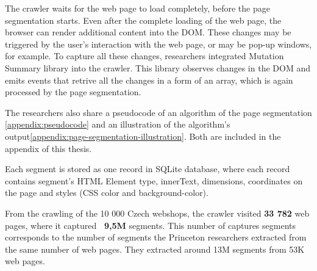     The crawler waits for the web page to load completely, before the page segmentation starts. Even after the complete loading of the web page, the browser can render additional content into the DOM. These changes may be triggered by the user's interaction with the web page, or may be pop-up windows, for example. To capture all these changes, researchers integrated Mutation Summary \cite{mutation-summary} library into the crawler. This library observes changes in the DOM and emits events that retrive all the changes in a form of an array, which is again processed by the page segmentation.

    The researchers also share a pseudocode of an algorithm of the page segmentation \ref{appendix:pseudocode} and an illustration of the algorithm's output\ref{appendix:page-segmentation-illustration}. Both are included in the appendix of this thesis.

    Each segment is stored as one record in SQLite database, where each record contains segment's HTML Element type, innerText, dimensions, coordinates on the page and styles (CSS color and background-color).

    From the crawling of the 10 000 Czech webshops, the crawler visited \textbf{33 782} web pages, where it captured \textbf{~9,5M} segments. This number of captures segments corresponds to the number of segments the Princeton researchers extracted from the same number of web pages. They extracted around 13M segments from 53K web pages.